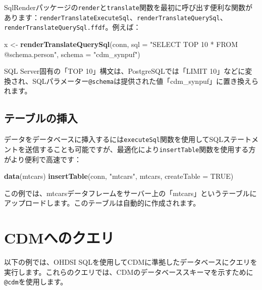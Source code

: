 \documentclass[
  11pt]{book}
\newenvironment{Shaded}{\begin{snugshade}}{\end{snugshade}}
\newcommand{\AttributeTok}[1]{\textcolor[rgb]{0.13,0.29,0.53}{#1}}
\newcommand{\ConstantTok}[1]{\textcolor[rgb]{0.56,0.35,0.01}{#1}}
\newcommand{\FunctionTok}[1]{\textcolor[rgb]{0.13,0.29,0.53}{\textbf{#1}}}
\newcommand{\NormalTok}[1]{#1}
\newcommand{\OtherTok}[1]{\textcolor[rgb]{0.56,0.35,0.01}{#1}}
\newcommand{\StringTok}[1]{\textcolor[rgb]{0.31,0.60,0.02}{#1}}
\theoremstyle{definition}
\theoremstyle{definition}
\theoremstyle{definition}
\theoremstyle{definition}
\theoremstyle{remark}
\begin{document}
SqlRenderパッケージの\texttt{render}と\texttt{translate}関数を最初に呼び出す便利な関数があります：\texttt{renderTranslateExecuteSql}、\texttt{renderTranslateQuerySql}、\texttt{renderTranslateQuerySql.ffdf}。例えば：

\begin{Shaded}
\begin{Highlighting}[]
\NormalTok{x }\OtherTok{\textless{}{-}} \FunctionTok{renderTranslateQuerySql}\NormalTok{(conn,}
                             \AttributeTok{sql =} \StringTok{"SELECT TOP 10 * FROM @schema.person"}\NormalTok{,}
                             \AttributeTok{schema =} \StringTok{"cdm\_synpuf"}\NormalTok{)}
\end{Highlighting}
\end{Shaded}

SQL Server固有の「TOP 10」構文は、PostgreSQLでは「LIMIT 10」などに変換され、SQLパラメーター\texttt{@schema}は提供された値「cdm\_synpuf」に置き換えられます。

\subsection{テーブルの挿入}\label{ux30c6ux30fcux30d6ux30ebux306eux633fux5165}

データをデータベースに挿入するには\texttt{executeSql}関数を使用してSQLステートメントを送信することも可能ですが、最適化により\texttt{insertTable}関数を使用する方がより便利で高速です：

\begin{Shaded}
\begin{Highlighting}[]
\FunctionTok{data}\NormalTok{(mtcars)}
\FunctionTok{insertTable}\NormalTok{(conn, }\StringTok{"mtcars"}\NormalTok{, mtcars, }\AttributeTok{createTable =} \ConstantTok{TRUE}\NormalTok{)}
\end{Highlighting}
\end{Shaded}

この例では、mtcarsデータフレームをサーバー上の「mtcars」というテーブルにアップロードします。このテーブルは自動的に作成されます。

\section{CDMへのクエリ}\label{QueryTheCdm}

以下の例では、OHDSI SQLを使用してCDMに準拠したデータベースにクエリを実行します。これらのクエリでは、CDMのデータベーススキーマを示すために\texttt{@cdm}を使用します。
\end{document}
